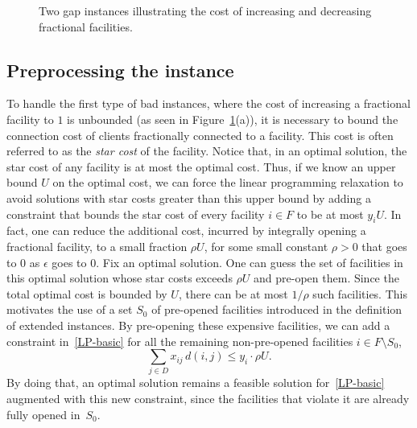 \begin{figure}[h]
    \centering
    \resizebox{\textwidth}{!}{
    }
    \caption{Two gap instances illustrating the cost of increasing and decreasing fractional facilities.}
    \label{fig:gap_examples}
\end{figure}


\subsection{Preprocessing the instance}
To handle the first type of bad instances, where the cost of increasing a fractional facility to $1$ is unbounded (as seen in Figure~\ref{fig:gap_examples}(a)), it is necessary to bound the connection cost of clients fractionally connected to a facility. This cost is often referred to as the \emph{star cost} of the facility.
Notice that, in an optimal solution, the star cost of any facility is at most the optimal cost.
Thus, if we know an upper bound $U$ on the optimal cost, we can force the linear programming relaxation to avoid solutions with star costs greater than this upper bound by adding a constraint that bounds the star cost of every facility $i \in F$ to be at most $y_i U$. In fact, one can reduce the additional cost, incurred by integrally opening a fractional facility, to a small fraction $\rho U$, for some small constant $\rho > 0$ that goes to $0$ as $\epsilon$ goes to $0$.
Fix an optimal solution.
One can guess the set of facilities in this optimal solution whose star costs exceeds $\rho U$ and pre-open them. Since the total optimal cost is bounded by $U$, there can be at most $1/\rho$ such facilities. This motivates the use of a set $S_0$ of pre-opened facilities introduced in the definition of extended instances. By pre-opening these expensive facilities, we can add a constraint in~\eqref{LP-basic} for all the remaining non-pre-opened facilities $i \in F \setminus S_0$,
\[
\sum_{j \in D} x_{ij} \, d(i,j) \le y_i \cdot \rho U.
\]
By doing that, an optimal solution remains a feasible solution for~\eqref{LP-basic} augmented with this new constraint, since the facilities that violate it are already fully opened in~$S_0$.

